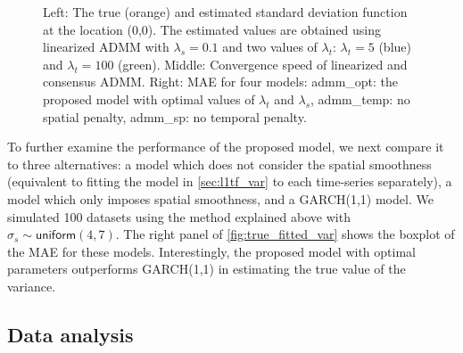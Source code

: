 \documentclass{article}
\begin{document}
\begin{figure}[tb]
  \caption{Left: The true (orange) and estimated standard deviation 
    function at the location (0,0). The estimated values are
    obtained using linearized ADMM with $\lambda_s=0.1$ and two
    values of $\lambda_t$: $\lambda_t=5$ (blue) and
    $\lambda_t=100$ (green). Middle: Convergence speed of linearized and consensus ADMM. Right: MAE for four models: admm\_opt: the proposed model with optimal values of $\lambda_t$ and $\lambda_s$, admm\_temp: no spatial penalty, admm\_sp: no temporal penalty.} \label{fig:true_fitted_var}
\end{figure}



To further examine the performance of the proposed model, we next
compare it to three alternatives: a model which does not consider the
spatial smoothness (equivalent to fitting the model in
\autoref{sec:l1tf_var} to each time-series separately), a model which only imposes spatial smoothness, and a GARCH(1,1) model. We
simulated 100 datasets using the method explained above with $\sigma_s
\sim \mathsf{uniform}(4,7)$. The right panel of
\autoref{fig:true_fitted_var} shows the boxplot of the MAE for these
models. Interestingly, the proposed model with optimal parameters
outperforms GARCH(1,1) in estimating the true value of the variance.    


\subsection{Data analysis}
\label{sec:data}
\end{document}
